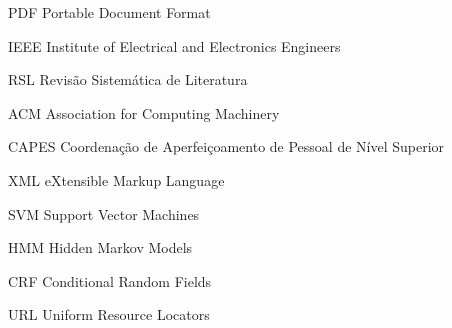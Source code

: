 \begin{siglas}
  \item[PDF] Portable Document Format
  \item[IEEE] Institute of Electrical and Electronics Engineers
  \item[RSL] Revisão Sistemática de Literatura
  \item[ACM] Association for Computing Machinery
  \item[CAPES] Coordenação de Aperfeiçoamento de Pessoal de Nível Superior
  \item[XML] eXtensible Markup Language
  \item[SVM] Support Vector Machines
  \item[HMM] Hidden Markov Models
  \item[CRF] Conditional Random Fields
  \item[URL] Uniform Resource Locators
\end{siglas}